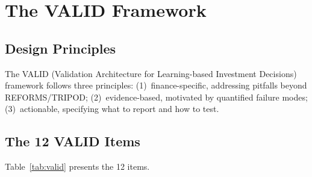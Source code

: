 \documentclass[preprint,12pt,authoryear]{elsarticle}
\begin{document}
\section{The VALID Framework}
\label{sec:valid}

\subsection{Design Principles}

The VALID (Validation Architecture for Learning-based Investment Decisions) framework follows three principles: (1)~finance-specific, addressing pitfalls beyond REFORMS/TRIPOD; (2)~evidence-based, motivated by quantified failure modes; (3)~actionable, specifying what to report and how to test.

\subsection{The 12 VALID Items}

Table~\ref{tab:valid} presents the 12 items.
\end{document}
